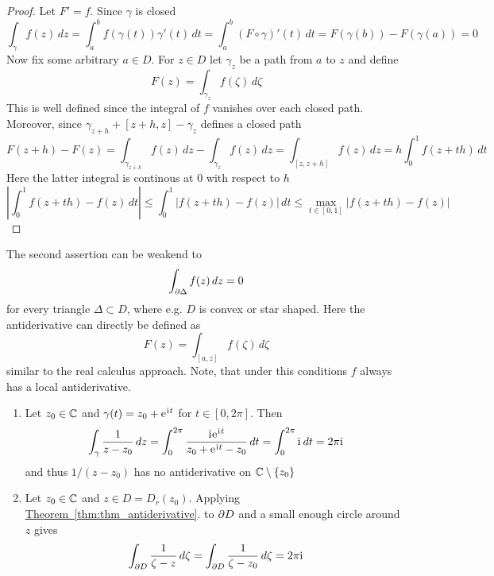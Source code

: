 \begin{proof} Let \( F' = f \). Since \( \gamma \) is closed
	\[
		\int_\gamma f(z)\,dz
		= \int_a^b f(\gamma(t))\gamma'(t)\,dt
		= \int_a^b (F\circ\gamma)'(t)\,dt
		= F(\gamma(b)) - F(\gamma(a)) = 0
	\]
	Now fix some arbitrary \( a \in D \). For \( z \in D \) let \( \gamma_z \) be a path from \( a \) to \( z \)
	and define
	\[
		F(z) = \int_{\gamma_z} f(\zeta)\,d\zeta
	\]
	This is well defined since the integral of \( f \) vanishes over each closed path. Moreover, since
	\( \gamma_{z + h} + [z + h,z] - \gamma_z \) defines a closed path
	\[
		F(z + h) - F(z)
		= \int_{\gamma_{z + h}} f(z)\,dz - \int_{\gamma_z} f(z)\,dz
		= \int_{[z,z + h]} f(z)\,dz
		= h\int_0^1 f(z + th)\,dt
	\]
	Here the latter integral is continous at \( 0 \) with respect to \( h \)
	\[
		\left|\int_0^1 f(z + th) - f(z)\,dt\right|
		\le \int_0^1 |f(z + th) - f(z)|\,dt
		\le \max_{t \in [0,1]}|f(z + th) - f(z)|
	\]
\end{proof}
\bigskip


\begin{corollary}The second assertion can be weakend to
	\[
		\int_{\partial\Delta} f(z)\,dz = 0
	\]
	for every triangle \( \Delta \subset D\), where e.g. \( D \) is convex or star shaped. Here the antiderivative
	can directly be defined as
	\[
		F(z) = \int_{[a,z]} f(\zeta)\,d\zeta
	\]
	similar to the real calculus approach. Note, that under this conditions \( f \) always has a local antiderivative.
\end{corollary}
\bigskip


\begin{examples}\hfill
	\begin{enumerate}
		\item Let \( z_0 \in \mathbb{C} \) and \( \gamma(t) = z_0 + \mathrm{e}\mkern1mu^{\mathrm{i}\mkern1mu t} \) for \( t \in [0, 2\pi] \). Then
		      \[
			      \int_\gamma \frac{1}{z - z_0}\,dz
			      = \int_0^{2\pi} \frac{\mathrm{i}\mkern1mu \mathrm{e}\mkern1mu^{\mathrm{i}\mkern1mu t}}{z_0 + \mathrm{e}\mkern1mu^{\mathrm{i}\mkern1mu t} - z_0}\,dt
			      = \int_0^{2\pi} \mathrm{i}\mkern1mu \, dt
			      = 2\pi\mathrm{i}\mkern1mu
		      \]
		      and thus \( 1/ (z - z_0 ) \) has no antiderivative on \( \mathbb{C} \setminus \{z_0\} \)
		\item Let \( z_0 \in \mathbb{C} \) and \( z \in D = D_r(z_0) \). Applying
		      \hyperref[thm:thm_antiderivative]{Theorem~\ref*{thm:thm_antiderivative}}.
		      to \( \partial D \) and a small enough circle around \( z \) gives
		      \[
			      \int_{\partial D} \frac{1}{\zeta - z}\,d\zeta
			      = \int_{\partial D} \frac{1}{\zeta - z_0}\,d\zeta
			      = 2\pi\mathrm{i}\mkern1mu
		      \]
	\end{enumerate}
\end{examples}
\bigskip


